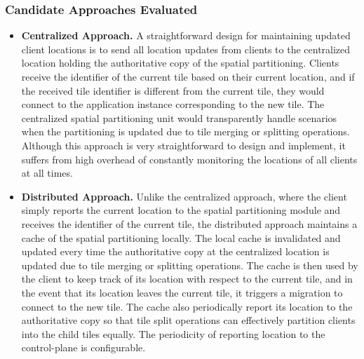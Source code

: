 \subsubsection{Candidate Approaches Evaluated}
\begin{itemize}
\item \textbf{Centralized Approach. }A straightforward design for maintaining updated client locations is to send all location updates from clients to the centralized location holding the authoritative copy of the spatial partitioning. Clients receive the identifier of the current tile based on their current location, and if the received tile identifier is different from the current tile, they would connect to the application instance corresponding to the new tile. The centralized spatial partitioning unit would transparently handle scenarios when the partitioning is updated due to tile merging or splitting operations. Although this approach is very straightforward to design and implement, it suffers from high overhead of constantly monitoring the locations of all clients at all times.
\item \textbf{Distributed Approach. } Unlike the centralized approach, where the client simply reports the current location to the spatial partitioning module and receives the identifier of the current tile, the distributed approach maintains a cache of the spatial partitioning locally. The local cache is invalidated and updated every time the authoritative copy at the centralized location is updated due to tile merging or splitting operations. The cache is then used by the client to keep track of its location with respect to the current tile, and in the event that its location leaves the current tile, it triggers a migration to connect to the new tile. The cache also periodically report its location to the authoritative copy so that tile split operations can effectively partition clients into the child tiles equally. The periodicity of reporting location to the control-plane is configurable.
\end{itemize}

